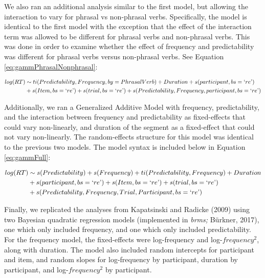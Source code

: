 \documentclass[
  man,floatsintext]{apa6}
\begin{document}
We also ran an additional analysis similar to the first model, but allowing the interaction to vary for phrasal vs non-phrasal verbs. Specifically, the model is identical to the first model with the exception that the effect of the interaction term was allowed to be different for phrasal verbs and non-phrasal verbs. This was done in order to examine whether the effect of frequency and predictability was different for phrasal verbs versus non-phrasal verbs. See Equation \eqref{eq:gammPhrasalNonphrasal}:

\begin{equation}
\begin{aligned}
\label{eq:gammPhrasalNonphrasal}
log(RT) & \sim ti(Predictability, Frequency, by = PhrasalVerb) + Duration + s(participant, bs = `re\text{'}) \\ 
& + s(Item, bs = `re\text{'}) + s(trial, bs = `re\text{'}) + s(Predictability, Frequency, participant, bs = `re\text{'}) 
\end{aligned}
\end{equation}

Additionally, we ran a Generalized Additive Model with frequency, predictability, and the interaction between frequency and predictability as fixed-effects that could vary non-linearly, and duration of the segment as a fixed-effect that could not vary non-linearly. The random-effects structure for this model was identical to the previous two models. The model syntax is included below in Equation \eqref{eq:gammFull}:

\begin{equation}
\begin{aligned}
\label{eq:gammFull}
log(RT) & \sim s(Predictability) + s(Frequency) + ti (Predictability, Frequency) + Duration \\ & + s(participant, bs = `re\text{'}) + s(Item, bs = `re\text{'})  
+ s(trial, bs = `re\text{'}) \\ & + s(Predictability, Frequency, Trial, Participant, bs = `re\text{'}) 
\end{aligned}
\end{equation}

Finally, we replicated the analyses from Kapatsinski and Radicke (2009) using two Bayesian quadratic regression models (implemented in \emph{brms;} Bürkner, 2017), one which only included frequency, and one which only included predictability. For the frequency model, the fixed-effects were log-frequency and log-\(frequency^2\), along with duration. The model also included random intercepts for participant and item, and random slopes for log-frequency by participant, duration by participant, and log-\(frequency^2\) by participant.
\end{document}
